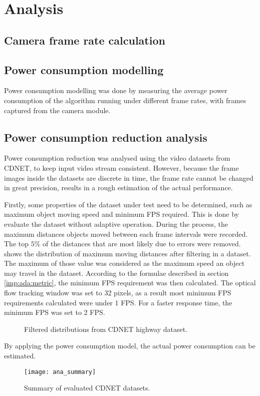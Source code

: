 \chapter{Analysis} \label{Chapter:Analysis}

\section{Camera frame rate calculation}


\section{Power consumption modelling}

Power consumption modelling was done by measuring the average power consumption of the algorithm running under different frame rates, with frames captured from the camera module.


\section{Power consumption reduction analysis}

Power consumption reduction was analysed using the video datasets from CDNET, to keep input video stream consistent. However, because the frame images inside the datasets are discrete in time, the frame rate cannot be changed in great precision, results in a rough estimation of the actual performance.

Firstly, some properties of the dataset under test need to be determined, such as maximum object moving speed and minimum FPS required. This is done by evaluate the dataset without adaptive operation. During the process, the maximum distances objects moved between each frame intervals were recorded. The top $5 \%$ of the distances that are most likely due to errors were removed.  shows the distribution of maximum moving distances after filtering in a dataset. The maximum of those value was considered as the maximum speed an object may travel in the dataset. According to the formulae described in section \ref{imp:ada:metric}, the minimum FPS requirement was then calculated. The optical flow tracking window was set to 32 pixels, as a result most minimum FPS requirements calculated were under 1 FPS. For a faster response time, the minimum FPS was set to 2 FPS.

\begin{figure}[htb]
  \centering
  \caption{Filtered distributions from CDNET highway dataset.}
  \label{ana:ada}
\end{figure}

By applying the power consumption model, the actual power consumption can be estimated.

\begin{figure}[htb]
  \centering
  \texttt{[image: ana\_summary]}
  \caption{Summary of evaluated CDNET datasets.}
  \label{ana:summary}
\end{figure}

